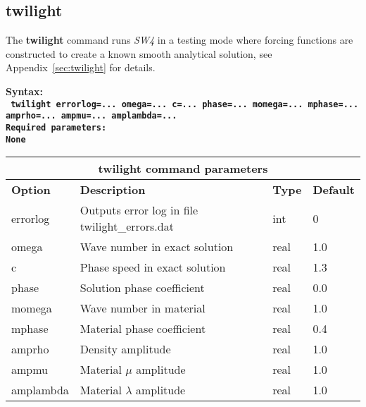 \documentclass[11pt]{report}
\begin{document}
\subsection{twilight}
\label{keyword:twilight}
The {\bf twilight} command runs \emph{SW4} in a testing mode where forcing functions are constructed to
create a known smooth analytical solution, see Appendix~\ref{sec:twilight} for details. 
\begin{flushleft}
\bf
Syntax:\\
\tt
twilight errorlog=... omega=... c=... phase=... momega=... mphase=... amprho=... ampmu=... amplambda=...
\\
\bf Required parameters:\\
\rm
None
\end{flushleft}
\begin{center}
\begin{tabular}{|l|p{8cm}|l|l|} \hline
\multicolumn{4}{|c|}{\bf twilight command parameters}\\ \hline
\bf{Option} & \bf{Description} & \bf{Type} & \bf{Default} \\ \hline \hline
errorlog & Outputs error log in file twilight\_errors.dat & int & 0 \\ \hline
omega & Wave number in exact solution                           & real & 1.0 \\ \hline
c & Phase speed in exact solution                         & real & 1.3 \\ \hline
phase & Solution phase coefficient                        & real & 0.0 \\ \hline
momega & Wave number in material                          & real & 1.0 \\ \hline
mphase & Material phase coefficient                       & real & 0.4 \\ \hline
amprho & Density amplitude                                & real & 1.0 \\ \hline
ampmu & Material $\mu$ amplitude                          & real & 1.0 \\ \hline
amplambda & Material $\lambda$ amplitude                  & real & 1.0 \\ \hline
\end{tabular}
\end{center}

\end{document}
